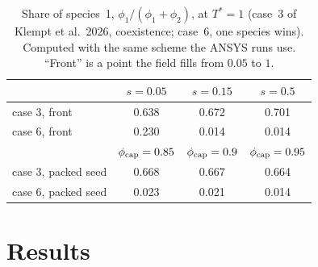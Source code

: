 \begin{table}[htbp]
  \centering
  \caption[Sensitivity to the two coupling assumptions]{%
    Share of species~1, $\phi_1/(\phi_1+\phi_2)$, at $T^*=1$ (case~3 of Klempt et al.\ 2026, coexistence;
    case~6, one species wins). Computed with the same scheme the ANSYS runs
    use. ``Front'' is a point the field fills from $0.05$ to $1$.}
  \label{tab:ch5-sensitivity}
  \begin{tabular}{lccc}
    \hline
    & $s=0.05$ & $s=0.15$ & $s=0.5$\\
    \hline
    case 3, front & 0.638 & 0.672 & 0.701\\
    case 6, front & 0.230 & 0.014 & 0.014\\
    \hline
    & $\phi_{\rm cap}=0.85$ & $\phi_{\rm cap}=0.9$ & $\phi_{\rm cap}=0.95$\\
    \hline
    case 3, packed seed & 0.668 & 0.667 & 0.664\\
    case 6, packed seed & 0.023 & 0.021 & 0.014\\
    \hline
  \end{tabular}
\end{table}


\section{Results}
\label{sec:ch5-results}


